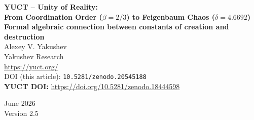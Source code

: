 \documentclass[11pt,a4paper]{article}
\begin{document}
	
	\begin{titlepage}
		\centering
		\vspace*{2cm}
		
		{\Huge\bfseries YUCT – Unity of Reality:\\[0.3cm]
			From Coordination Order (\(\beta = 2/3\)) to Feigenbaum Chaos (\(\delta = 4.6692\))}\\[1cm]
		
		{\Large\bfseries Formal algebraic connection between constants of creation and destruction}\\[2cm]
		
		{\large Alexey V. Yakushev}\\[0.5cm]
		{\normalsize Yakushev Research}\\[0.3cm]
		{\normalsize \url{https://yuct.org/}}\\[1.5cm]
		
		{\normalsize DOI (this article): \texttt{10.5281/zenodo.20545188}}\\
		\vspace*{1cm}
		\textbf{YUCT DOI:} \url{https://doi.org/10.5281/zenodo.18444598}\\
		\vspace*{1cm}
		
		{\normalsize June 2026}\\[0.3cm]
		{\normalsize Version 2.5}\\[2cm]
	\end{titlepage}
	
\end{document}
